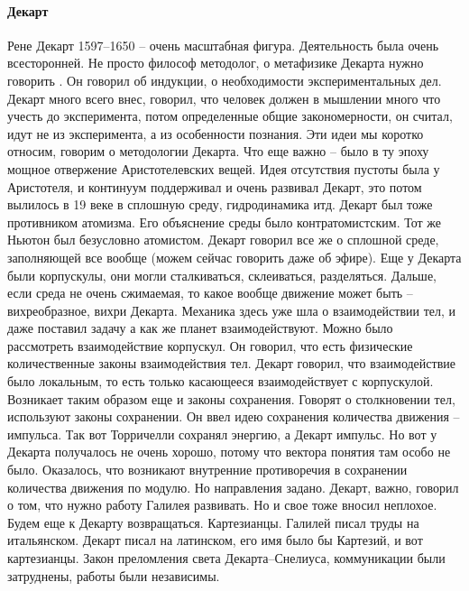 \documentclass[a4paper, 12pt]{article}
\begin{document}
\paragraph{Декарт}
Рене Декарт 1597--1650 -- очень масштабная фигура. Деятельность была 
очень всесторонней. Не просто философ методолог, о метафизике Декарта 
нужно говорить . Он говорил об индукции, о необходимости 
экспериментальных дел. Декарт много всего внес, говорил, что человек 
должен в мышлении много что учесть до эксперимента, потом определенные 
общие закономерности, он считал, идут не из эксперимента, а из 
особенности познания. Эти идеи мы коротко относим, говорим о методологии 
Декарта. Что еще важно -- было в ту эпоху мощное отвержение 
Аристотелевских вещей. Идея отсутствия пустоты была у Аристотеля, 
и континуум поддерживал и очень развивал Декарт, это потом вылилось в 19 
веке в сплошную среду, гидродинамика итд. Декарт был тоже противником 
атомизма. Его объяснение среды было контратомистским. Тот же Ньютон был 
безусловно атомистом. Декарт говорил все же о сплошной среде, 
заполняющей все вообще (можем сейчас говорить даже об эфире). Еще 
у Декарта были корпускулы, они могли сталкиваться, склеиваться, 
разделяться. Дальше, если среда не очень сжимаемая, то какое вообще 
движение может быть -- вихреобразное, вихри Декарта. Механика здесь уже 
шла о взаимодействии тел, и даже поставил задачу а как же планет 
взаимодействуют. Можно было рассмотреть взаимодействие корпускул. Он 
говорил, что есть физические количественные законы взаимодействия тел. 
Декарт говорил, что взаимодействие было локальным, то есть только 
касающееся взаимодействует с корпускулой. Возникает таким образом еще 
и законы сохранения. Говорят о столкновении тел, используют законы 
сохранении. Он ввел идею сохранения количества движения -- импульса. Так 
вот Торричелли сохранял энергию, а Декарт импульс. Но вот у Декарта 
получалось не очень хорошо, потому что вектора понятия там особо не 
было. Оказалось, что возникают внутренние противоречия в сохранении 
количества движения по модулю. Но направления задано. Декарт, важно, 
говорил о том, что нужно работу Галилея развивать. Но и свое тоже вносил 
неплохое. Будем еще к Декарту возвращаться. Картезианцы. Галилей писал 
труды на итальянском. Декарт писал на латинском, его имя было бы 
Картезий, и вот картезианцы. Закон преломления света Декарта--Снелиуса, 
коммуникации были затруднены, работы были независимы.
\end{document}
